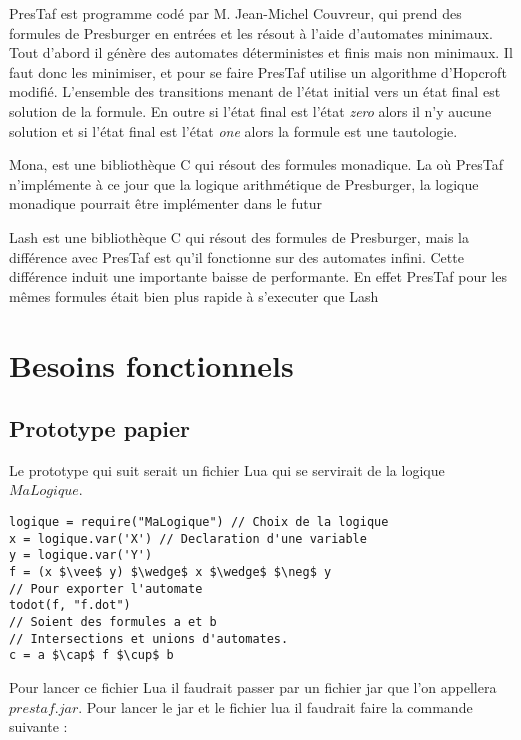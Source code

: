 \documentclass{article}%
\begin{document}
PresTaf est programme codé par M. Jean-Michel Couvreur, qui prend des formules de Presburger en entrées et les résout à l'aide d'automates minimaux. Tout d'abord il génère des automates déterministes et finis mais non minimaux. Il faut donc les minimiser, et pour se faire PresTaf utilise un algorithme d'Hopcroft modifié. L'ensemble des transitions menant de l'état initial vers un état final est solution de la formule. En outre si l'état final est l'état \emph{zero} alors il n'y aucune solution et si l'état final est l'état \emph{one} alors la formule est une tautologie.\\\par

Mona, est une bibliothèque C qui résout des formules monadique. La où PresTaf n'implémente à ce jour que la logique arithmétique de Presburger, la logique monadique pourrait être implémenter dans le futur\\\par

Lash\cite{lash} est une bibliothèque C qui résout des formules de Presburger, mais la différence avec PresTaf est qu'il fonctionne sur des automates infini. Cette différence induit une importante baisse de performante. En effet PresTaf pour les mêmes formules était bien plus rapide à s'executer que Lash\cite{DBLP:conf/wia/Couvreur04}\\\par

\section{Besoins fonctionnels}

\subsection{Prototype papier}

Le prototype qui suit serait un fichier Lua qui se servirait de la logique $MaLogique$.

\begin{lstlisting}[mathescape=true, frame=single]
logique = require("MaLogique") // Choix de la logique
x = logique.var('X') // Declaration d'une variable
y = logique.var('Y')
f = (x $\vee$ y) $\wedge$ x $\wedge$ $\neg$ y
// Pour exporter l'automate
todot(f, "f.dot")
// Soient des formules a et b
// Intersections et unions d'automates.
c = a $\cap$ f $\cup$ b
\end{lstlisting}

Pour lancer ce fichier Lua il faudrait passer par un fichier jar que l'on appellera $prestaf.jar$. Pour lancer le jar et le fichier lua il faudrait faire la commande suivante :
\end{document}
